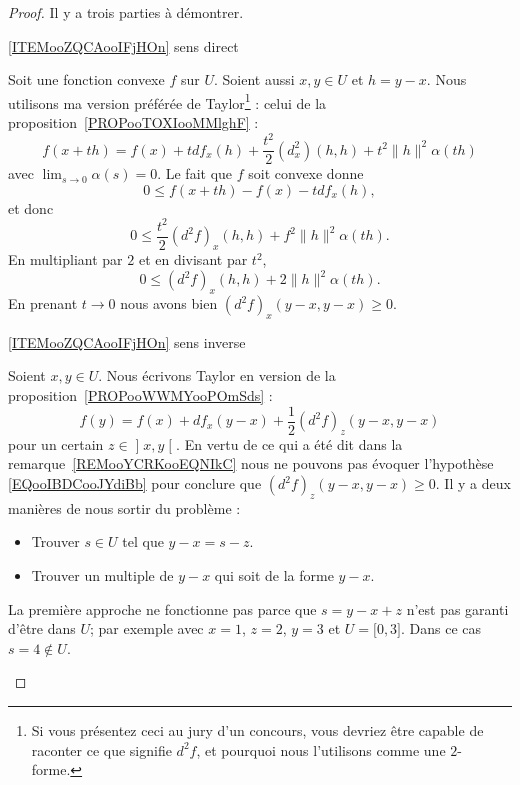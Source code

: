 \begin{proof}
    Il y a trois parties à démontrer.
    \begin{subproof}
    \item[\ref{ITEMooZQCAooIFjHOn} sens direct]

        Soit une fonction convexe \( f\) sur \( U\). Soient aussi \( x,y\in U\) et \( h=y-x\). Nous utilisons ma version préférée de Taylor\footnote{Si vous présentez ceci au jury d'un concours, vous devriez être capable de raconter ce que signifie \( d^2f\), et pourquoi nous l'utilisons comme une \( 2\)-forme.} : celui de la proposition~\ref{PROPooTOXIooMMlghF} :
        \begin{equation}
            f(x+th)=f(x)+tdf_x(h)+\frac{ t^2 }{2}(d^2_x)(h,h)+t^2\| h \|^2\alpha(th)
        \end{equation}
        avec \( \lim_{s\to 0}\alpha(s)=0\). Le fait que \( f\) soit convexe donne
        \begin{equation}
            0\leq f(x+th)-f(x)-tdf_x(h),
        \end{equation}
        et donc
        \begin{equation}
            0\leq \frac{ t^2 }{2}(d^2f)_x(h,h)+f^2\| h \|^2\alpha(th).
        \end{equation}
        En multipliant par \( 2\) et en divisant par \( t^2\),
        \begin{equation}
            0\leq (d^2f)_x(h,h)+2\| h \|^2\alpha(th).
        \end{equation}
        En prenant \( t\to 0\) nous avons bien  \( (d^2f)_x(y-x,y-x)\geq 0\).

    \item[\ref{ITEMooZQCAooIFjHOn} sens inverse]

        Soient \( x,y\in U\). Nous écrivons Taylor en version de la proposition~\ref{PROPooWWMYooPOmSds} :
        \begin{equation}
            f(y)=f(x)+df_x(y-x)+\frac{ 1 }{2}(d^2f)_z(y-x,y-x)
        \end{equation}
    pour un certain \( z\in\mathopen] x , y \mathclose[\). En vertu de ce qui a été dit dans la remarque~\ref{REMooYCRKooEQNIkC} nous ne pouvons pas évoquer l'hypothèse \eqref{EQooIBDCooJYdiBb} pour conclure que \( (d^2f)_z(y-x,y-x)\geq 0\). Il y a deux manières de nous sortir du problème :
        \begin{itemize}
            \item Trouver \( s\in U\) tel que \( y-x=s-z\).
            \item Trouver un multiple de \( y-x\) qui soit de la forme \( y-x\).
        \end{itemize}
        La première approche ne fonctionne pas parce que \( s=y-x+z\) n'est pas garanti d'être dans \( U\); par exemple avec \( x=1\), \( z=2\), \( y=3\) et \( U=\mathopen[ 0 , 3 \mathclose]\). Dans ce cas \( s=4\notin U\).


\end{subproof}
\end{proof}
